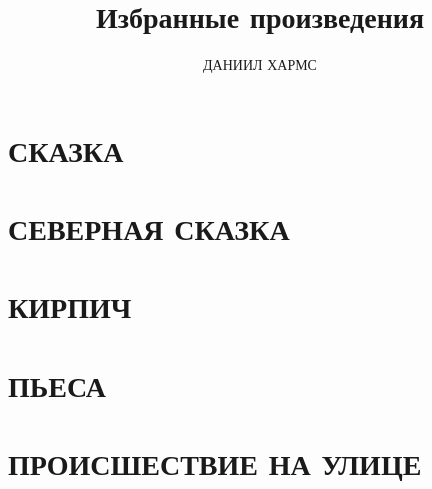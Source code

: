 \documentclass[12pt]{article}
\title{Избранные произведения}
\author{ДАНИИЛ ХАРМС}
\date{}
\begin{document}
\setlength{\parindent}{1.5cm}
\maketitle
\vspace*{-\baselineskip}



\section*{\centering СКАЗКА}


\section*{\centering СЕВЕРНАЯ СКАЗКА}






\section*{\centering КИРПИЧ}


\section*{\centering ПЬЕСА}


\section*{\centering ПРОИСШЕСТВИЕ НА УЛИЦЕ}

\end{document}
